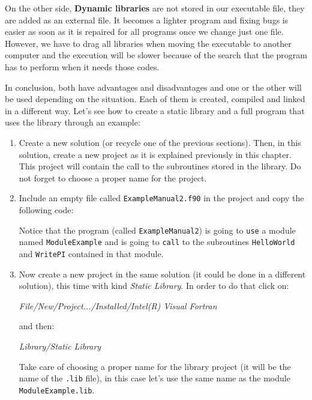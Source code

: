 \begin{enumerate}
	On the other side, \textbf{Dynamic libraries} are not stored in our executable file, they are added as an external file. It becomes a lighter program and fixing bugs is easier as soon as it is repaired for all programs once we change just one file. However, we have to drag all libraries when moving the executable to another computer and the execution will be slower because of the search that the program has to perform when it needs those codes. 
    
    In conclusion, both have advantages and disadvantages and one or the other will be used depending on the situation. Each of them is created, compiled and linked in a different way. Let's see how to create a static library and a full program that uses the library through an example:
	
	\begin{enumerate}
        
		\item Create a new solution (or recycle one of the previous sections). Then, in this solution, create a new project as it is explained previously in this chapter. This project will contain the call to the subroutines stored in the library. Do not forget to choose a proper name for the project.
        
		\item Include an empty file called \texttt{ExampleManual2.f90} in the project and copy the following code:
	    
        \vspace{0.5cm}
		
        
        Notice that the program (called \verb|ExampleManual2|) is going to \verb|use| a module named \verb|ModuleExample| and is going to \verb|call| to the subroutines \verb|HelloWorld| and \verb|WritePI| contained in that module. 
		
		\item Now create a new project in the same solution (it could be done in a different solution), this time with kind \textit{Static Library}. In order to do that click on:
        
        \textit{File/New/Project.../Installed/Intel(R) Visual Fortran}
        
        and then: 
        
        \textit{Library/Static Library}
        
        Take care of choosing a proper name for the library project (it will be the name of the \texttt{.lib} file), in this case let's use the same name as the module \texttt{ModuleExample.lib}.
        

\end{enumerate}
\end{enumerate}
